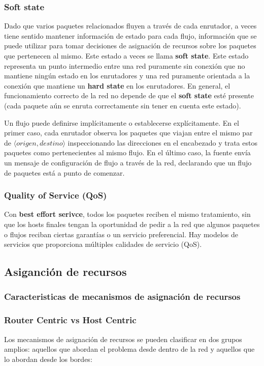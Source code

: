 \subsubsection*{Soft state}
Dado que varios paquetes relacionados fluyen a través de cada enrutador, a veces tiene sentido mantener información de estado para cada flujo, información que se puede utilizar para tomar decisiones de asignación de recursos sobre los paquetes que pertenecen al mismo. Este estado a veces se llama \textbf{soft state}. Este estado representa un punto intermedio entre una red puramente sin conexión que no mantiene ningún estado en los enrutadores y una red puramente orientada a la conexión que mantiene un \textbf{hard state} en los enrutadores. En general, el funcionamiento correcto de la red no depende de que el \textbf{soft state} esté presente (cada paquete aún se enruta correctamente sin tener en cuenta este estado).

Un flujo puede definirse implícitamente o establecerse explícitamente. En el primer caso, cada enrutador observa los paquetes que viajan entre el mismo par de \(\langle origen , destino\rangle\) inspeccionando las direcciones en el encabezado y trata estos paquetes como pertenecientes al mismo flujo. En el último caso, la fuente envía un mensaje de configuración de flujo a través de la red, declarando que un flujo de paquetes está a punto de comenzar.

\subsubsection*{Quality of Service (QoS)} 
Con \textbf{best effort serivce}, todos los paquetes reciben el mismo tratamiento, sin que los hosts finales tengan la oportunidad de pedir a la red que algunos paquetes o flujos reciban ciertas garantías o un servicio preferencial. Hay modelos de servicios que proporciona múltiples calidades de servicio (QoS). 

\subsection{Asiganción de recursos}
\subsubsection{Caracteristicas de mecanismos de asignación de recursos}
\subsubsection*{Router Centric vs Host Centric}
Los mecanismos de asignación de recursos se pueden clasificar en dos grupos amplios: aquellos que abordan el problema desde dentro de la red y aquellos que lo abordan desde los bordes: 

